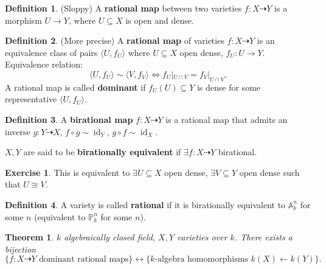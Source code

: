 \documentclass[12pt]{article}
\DeclareMathOperator{\id}{id}
\newtheorem*{theorem}{Theorem}
\theoremstyle{definition}
\newtheorem*{definition}{Definition}
\newtheorem*{exercise}{Exercise}
\theoremstyle{remark}
\begin{document}
\begin{definition}
(Sloppy) A \textbf{rational map} between two varieties $f:X\dashrightarrow Y$ is a morphism $U\rightarrow Y$, where $U\subseteq X$ is open and dense.
\end{definition}

\begin{definition}
(More precise) A \textbf{rational map} of varieties $f:X\dashrightarrow Y$ is an equivalence class of pairs $\langle U,f_U\rangle$ where $U\subseteq X$ open dense, $f_U:U\rightarrow Y$. Equivalence relation:
\[\langle U,f_U\rangle\sim\langle V,f_V\rangle\Longleftrightarrow f_U|_{U\cap V}=f_V|_{U\cap V}.\]
A rational map is called \textbf{dominant} if $f_U(U)\subseteq Y$ is dense for some representative $\langle U,f_U\rangle$.
\end{definition}

\begin{definition}
A \textbf{birational map} $f:X\dashrightarrow Y$ is a rational map that admits an inverse $g:Y\dashrightarrow X$, $f\circ g\sim\id_Y$, $g\circ f\sim\id_X$.

$X,Y$ are said to be \textbf{birationally equivalent} if $\exists f:X\dashrightarrow Y$ birational.
\end{definition}

\begin{exercise}
This is equivalent to $\exists U\subseteq X$ open dense, $\exists V\subseteq Y$ open dense such that $U\cong V$.
\end{exercise}

\begin{definition}
A variety is called \textbf{rational} if it is birationally equivalent to $\mathbb{A}_k^n$ for some $n$ (equivalent to $\mathbb{P}_k^n$ for some $n$).
\end{definition}

\begin{theorem}
$k$ algebraically closed field, $X,Y$ varieties over $k$. There exists a bijection
\[\{f:X\dashrightarrow Y\text{ dominant rational maps}\}\longleftrightarrow\{k\text{-algebra homomorphisms }k(X)\leftarrow k(Y)\}.\]
\end{theorem}
\end{document}
